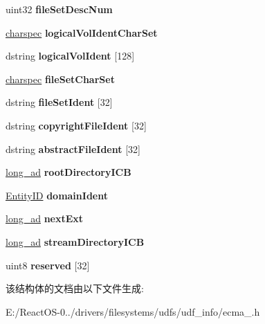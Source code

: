 \begin{DoxyCompactItemize}
uint32 {\bfseries file\+Set\+Desc\+Num}
\item 
\mbox{\label{struct___f_i_l_e___s_e_t___d_e_s_c_aa26d29f24432b32a2a8ba23c49655d87}} 
\hyperlink{structcharspec}{charspec} {\bfseries logical\+Vol\+Ident\+Char\+Set}
\item 
\mbox{\label{struct___f_i_l_e___s_e_t___d_e_s_c_a9704d214413cefb95ac7de7e3b2c3a79}} 
dstring {\bfseries logical\+Vol\+Ident} \mbox{[}128\mbox{]}
\item 
\mbox{\label{struct___f_i_l_e___s_e_t___d_e_s_c_a8498aeba6f315fbee1c8b4692c6d9b5b}} 
\hyperlink{structcharspec}{charspec} {\bfseries file\+Set\+Char\+Set}
\item 
\mbox{\label{struct___f_i_l_e___s_e_t___d_e_s_c_a1fc1740c49bcfb3bb6c29d5337bc88a0}} 
dstring {\bfseries file\+Set\+Ident} \mbox{[}32\mbox{]}
\item 
\mbox{\label{struct___f_i_l_e___s_e_t___d_e_s_c_a859922c13b5e4b31c7abda5825398f71}} 
dstring {\bfseries copyright\+File\+Ident} \mbox{[}32\mbox{]}
\item 
\mbox{\label{struct___f_i_l_e___s_e_t___d_e_s_c_a24982918395bd5306e09f880f869c060}} 
dstring {\bfseries abstract\+File\+Ident} \mbox{[}32\mbox{]}
\item 
\mbox{\label{struct___f_i_l_e___s_e_t___d_e_s_c_a030287158145924cd29c8454019cca81}} 
\hyperlink{structlong__ad}{long\+\_\+ad} {\bfseries root\+Directory\+I\+CB}
\item 
\mbox{\label{struct___f_i_l_e___s_e_t___d_e_s_c_a62bd0f80ac5a595007696a017f5a4dfe}} 
\hyperlink{struct_entity_i_d}{Entity\+ID} {\bfseries domain\+Ident}
\item 
\mbox{\label{struct___f_i_l_e___s_e_t___d_e_s_c_a6ae4e611447995ea32607b1ff7192ac2}} 
\hyperlink{structlong__ad}{long\+\_\+ad} {\bfseries next\+Ext}
\item 
\mbox{\label{struct___f_i_l_e___s_e_t___d_e_s_c_ad1d42c25413ca7d0f84c61cb434e3108}} 
\hyperlink{structlong__ad}{long\+\_\+ad} {\bfseries stream\+Directory\+I\+CB}
\item 
\mbox{\label{struct___f_i_l_e___s_e_t___d_e_s_c_ae46ec923488484fb37c49c40991e4c0c}} 
uint8 {\bfseries reserved} \mbox{[}32\mbox{]}
\end{DoxyCompactItemize}


该结构体的文档由以下文件生成\+:\begin{DoxyCompactItemize}
\item 
E\+:/\+React\+O\+S-\/0../drivers/filesystems/udfs/udf\+\_\+info/ecma\+\_.\+h\end{DoxyCompactItemize}
